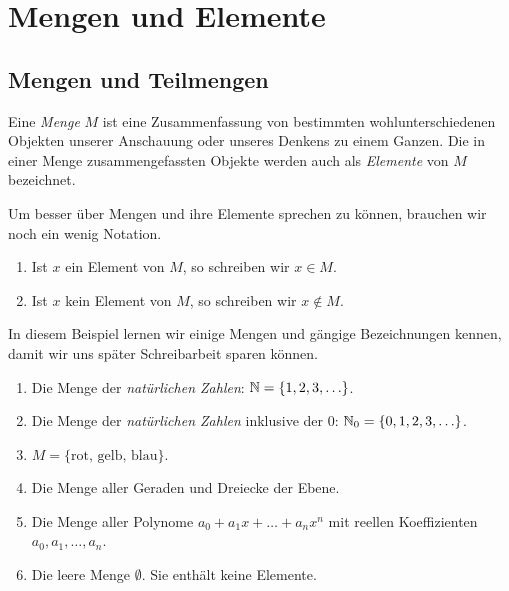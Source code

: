 \section{Mengen und Elemente}

\subsection{Mengen und Teilmengen}

\begin{frame}
\begin{mydef}
Eine \textit{Menge} $M$ ist eine Zusammenfassung von bestimmten
wohlunterschiedenen Objekten unserer Anschauung oder unseres Denkens zu einem
Ganzen.
Die in einer Menge zusammengefassten Objekte werden auch als \textit{Elemente}
von $M$ bezeichnet.
\end{mydef}

\begin{remark}
Um besser über Mengen und ihre Elemente sprechen zu können, brauchen wir noch
ein wenig Notation.

\begin{enumerate}
\item Ist $x$ ein Element von $M$, so schreiben wir $x \in M$.
\item Ist $x$ kein Element von $M$, so schreiben wir $x \notin M$.
\end{enumerate}
\end{remark}
\end{frame}


\begin{frame}
\begin{example}
In diesem Beispiel lernen wir einige Mengen und gängige Bezeichnungen kennen,
damit wir uns später Schreibarbeit sparen können.

\begin{enumerate}
\item Die Menge der \textit{natürlichen Zahlen}: $\mathbb{N} = \{1,2,3,\ldots\}$.
\item Die Menge der \textit{natürlichen Zahlen} inklusive der $0$:
$\mathbb{N}_0 = \{0,1,2,3,\ldots\}$.
\item $M = \{ \text{rot, gelb, blau} \}$.
\item Die Menge aller Geraden und Dreiecke der Ebene.
\item Die Menge aller Polynome $a_0 + a_1 x + \ldots + a_n x^n$ mit reellen
Koeffizienten $a_0,a_1,\ldots,a_n$.
\item Die leere Menge $\emptyset$. Sie enthält keine Elemente.
\end{enumerate}
\end{example}
\end{frame}


